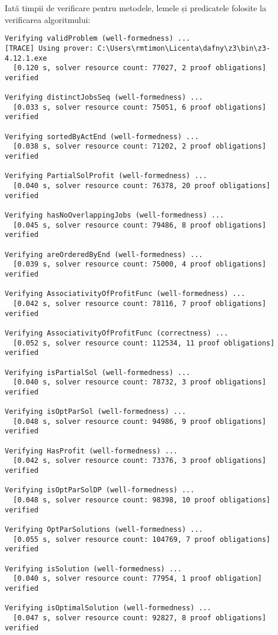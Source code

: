 Iată timpii de verificare pentru metodele, lemele și predicatele folosite la verificarea algoritmului:
\begin{Verbatim}[fontsize=\small]
Verifying validProblem (well-formedness) ...
[TRACE] Using prover: C:\Users\rmtimon\Licenta\dafny\z3\bin\z3-4.12.1.exe
  [0.120 s, solver resource count: 77027, 2 proof obligations]  verified

Verifying distinctJobsSeq (well-formedness) ...
  [0.033 s, solver resource count: 75051, 6 proof obligations]  verified

Verifying sortedByActEnd (well-formedness) ...
  [0.038 s, solver resource count: 71202, 2 proof obligations]  verified

Verifying PartialSolProfit (well-formedness) ...
  [0.040 s, solver resource count: 76378, 20 proof obligations]  verified

Verifying hasNoOverlappingJobs (well-formedness) ...
  [0.045 s, solver resource count: 79486, 8 proof obligations]  verified

Verifying areOrderedByEnd (well-formedness) ...
  [0.039 s, solver resource count: 75000, 4 proof obligations]  verified

Verifying AssociativityOfProfitFunc (well-formedness) ...
  [0.042 s, solver resource count: 78116, 7 proof obligations]  verified

Verifying AssociativityOfProfitFunc (correctness) ...
  [0.052 s, solver resource count: 112534, 11 proof obligations]  verified

Verifying isPartialSol (well-formedness) ...
  [0.040 s, solver resource count: 78732, 3 proof obligations]  verified

Verifying isOptParSol (well-formedness) ...
  [0.048 s, solver resource count: 94986, 9 proof obligations]  verified

Verifying HasProfit (well-formedness) ...
  [0.042 s, solver resource count: 73376, 3 proof obligations]  verified

Verifying isOptParSolDP (well-formedness) ...
  [0.048 s, solver resource count: 98398, 10 proof obligations]  verified

Verifying OptParSolutions (well-formedness) ...
  [0.055 s, solver resource count: 104769, 7 proof obligations]  verified

Verifying isSolution (well-formedness) ...
  [0.040 s, solver resource count: 77954, 1 proof obligation]  verified

Verifying isOptimalSolution (well-formedness) ...
  [0.047 s, solver resource count: 92827, 8 proof obligations]  verified


\end{Verbatim}
